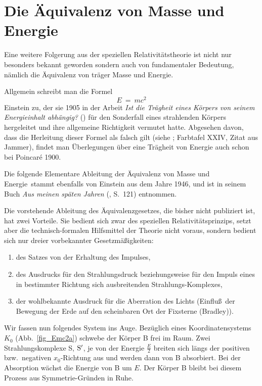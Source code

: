 \section{Die \"Aquivalenz von Masse und Energie}

Eine weitere Folgerung aus der speziellen
Relativit\"atstheorie ist nicht nur besonders bekannt
geworden sondern auch von fundamentaler 
Bedeutung, n\"amlich die \"Aquivalenz von tr\"ager Masse und Energie.

Allgemein schreibt man die Formel
\begin{equation}
\label{Emc}
           E ~=~ m c^2        
\end{equation}
Einstein 
zu, der sie 1905 in der Arbeit {\it Ist die Tr\"agheit eines
K\"orpers von seinem Energieinhalt abh\"angig?} (\cite{Einstein2}) 
f\"ur den Sonderfall eines strahlenden K\"orpers hergeleitet 
und ihre allgemeine Richtigkeit vermutet hatte. Abgesehen davon, dass
die Herleitung dieser Formel als falsch gilt (siehe \cite{Simonyi};
Farbtafel XXIV, Zitat aus Jammer), findet man \"Uberlegungen \"uber 
eine Tr\"agheit von Energie auch schon bei Poincar\'e 1900. 

Die folgende \glqq Elementare Ableitung der \"Aquivalenz von Masse und
Energie\grqq\ stammt ebenfalls von Einstein aus dem Jahre 1946, und ist
in seinem Buch {\it Aus meinen sp\"aten Jahren} (\cite{Einstein3}, S.~121) 
entnommen.

\small
Die vorstehende Ableitung des \"Aquivalenzgesetzes, die bisher nicht 
publiziert ist, hat zwei Vorteile. Sie bedient sich zwar des speziellen
Relativit\"atsprinzips, setzt aber die technisch-formalen Hilfsmittel
der Theorie nicht voraus, sondern bedient sich nur dreier vorbekannter
Gesetzm\"a\ss igkeiten:
\begin{enumerate}
\item
des Satzes von der Erhaltung des Impulses,
\item
des Ausdrucks f\"ur den Strahlungsdruck beziehungsweise f\"ur den
Impuls eines in bestimmter Richtung sich ausbreitenden
Strahlungs-Komplexes,
\item
der wohlbekannte Ausdruck f\"ur die Aberration des Lichts (Einflu\ss\
der Bewegung der Erde auf den scheinbaren Ort der Fixsterne (Bradley)).
\end{enumerate}

Wir fassen nun folgendes System ins Auge. Bez\"uglich eines 
Koordinatensystems $K_0$ (Abb.\ \ref{fig_Emc2a}) schwebe der K\"orper B frei im Raum.
Zwei Strahlungskomplexe S, ${\rm S}'$, je von der Energie
$\frac{E}{2}$ breiten sich l\"angs der positiven bzw.\ negativen 
$x_0$-Richtung
aus und werden dann von B absorbiert. Bei der Absorption w\"achst die
Energie von B um $E$. Der K\"orper B bleibt bei diesem Prozess aus
Symmetrie-Gr\"unden in Ruhe.


